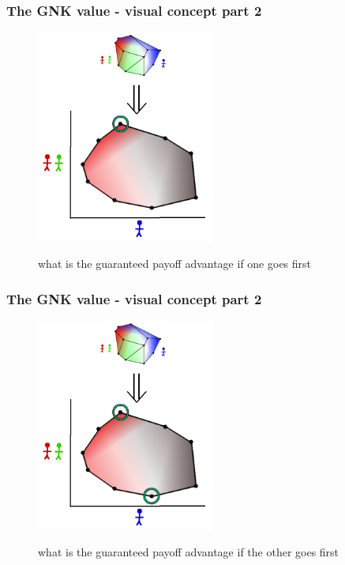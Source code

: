 \begin{frame} \frametitle{The GNK value - visual concept part 2} \begin{figure} \begin{center} \includegraphics[height=7cm]{figs/pa7} \end{center} what is the guaranteed payoff advantage if one goes first \end{figure} \end{frame}
\begin{frame} \frametitle{The GNK value - visual concept part 2} \begin{figure} \begin{center} \includegraphics[height=7cm]{figs/pa8} \end{center} what is the guaranteed payoff advantage if the other goes first \end{figure} \end{frame}

